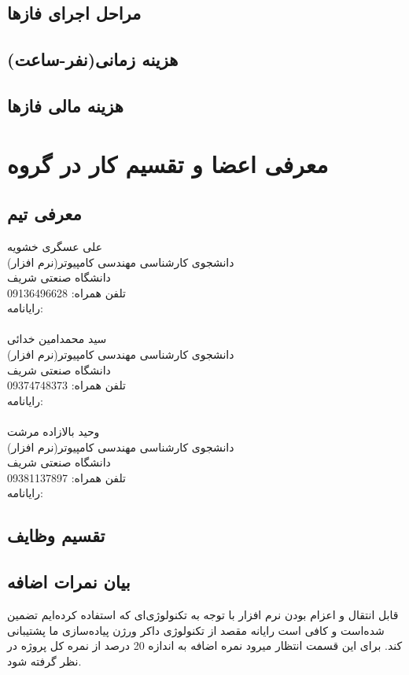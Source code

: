 \documentclass{article}
\begin{document}
\subsection{مراحل اجرای فازها}
\subsection{هزینه زمانی(نفر-ساعت)}
\subsection{هزینه مالی فازها}
\section{معرفی اعضا و تقسیم کار در گروه}
\subsection{معرفی تیم}
علی عسگری خشویه\\
دانشجوی کارشناسی مهندسی کامپیوتر(نرم افزار)\\
دانشگاه صنعتی شریف\\
تلفن همراه: 09136496628 \\
رایانامه: \\
\\
سید محمدامین خدائی\\
دانشجوی کارشناسی مهندسی کامپیوتر(نرم افزار)\\
دانشگاه صنعتی شریف\\
تلفن همراه: 09374748373\\
رایانامه: \\
\\
وحید بالازاده مرشت\\
دانشجوی کارشناسی مهندسی کامپیوتر(نرم افزار)\\
دانشگاه صنعتی شریف\\
تلفن همراه: 09381137897\\
رایانامه: 
\subsection{تقسیم وظایف}

\subsection{بیان نمرات اضافه}
قابل انتقال و اعزام بودن نرم افزار با توجه به تکنولوژی‌ای که استفاده کرده‌ایم تضمین شده‌است و کافی است رایانه مقصد از تکنولوژی داکر ورژن پیاده‌سازی ما پشتیبانی کند. برای این قسمت انتظار میرود نمره اضافه به اندازه 20 درصد از نمره کل پروژه در نظر گرفته شود.
\end{document}
